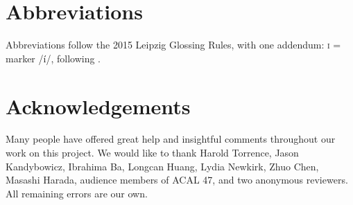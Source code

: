 \documentclass[output=paper,modfonts,nonflat,
]{langsci/langscibook}
\begin{document}
 
\section*{Abbreviations}\label{sec:duncan-et-al:abbreviations}

Abbreviations follow the 2015 Leipzig Glossing Rules, with one addendum: \textsc{i} =  marker /í/, following \citet{baker2010agreement}.

\section*{Acknowledgements}\label{sec:duncan-et-al:acknowledgments}

Many people have offered great help and insightful comments throughout our work on this project. We would like to thank Harold Torrence, Jason Kandybowicz, Ibrahima Ba, Longcan Huang, Lydia Newkirk, Zhuo Chen, Masashi Harada, audience members of ACAL 47, and two anonymous reviewers. All remaining errors are our own.

\sloppy
\printbibliography[heading=subbibliography,notkeyword=this]
\end{document}
